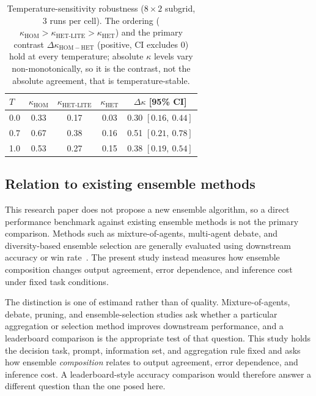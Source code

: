\documentclass{ieeeaccess}
\begin{document}
\begin{table}[!t]
\centering
\caption{Temperature-sensitivity robustness ($8\times 2$ subgrid, 3 runs per
cell). The ordering ($\kappa_{\mathrm{HOM}}>\kappa_{\mathrm{HET\text{-}LITE}}>\kappa_{\mathrm{HET}}$)
and the primary contrast $\Delta\kappa_{\mathrm{HOM-HET}}$ (positive, CI excludes
0) hold at every temperature; absolute $\kappa$ levels vary non-monotonically, so
it is the contrast, not the absolute agreement, that is temperature-stable.}
\label{tab:temp}
\begin{tabular}{lcccc}
\toprule
$T$ & $\kappa_{\mathrm{HOM}}$ & $\kappa_{\mathrm{HET\text{-}LITE}}$ &
$\kappa_{\mathrm{HET}}$ & $\Delta\kappa$ [95\% CI] \\
\midrule
0.0 & 0.33 & 0.17 & 0.03 & 0.30 $[0.16,\ 0.44]$ \\
0.7 & 0.67 & 0.38 & 0.16 & 0.51 $[0.21,\ 0.78]$ \\
1.0 & 0.53 & 0.27 & 0.15 & 0.38 $[0.19,\ 0.54]$ \\
\bottomrule
\end{tabular}
\end{table}

\subsection{Relation to existing ensemble methods}
This research paper does not propose a new ensemble algorithm, so a direct
performance
benchmark against existing ensemble methods is not the primary comparison.
Methods such as mixture-of-agents, multi-agent debate, and diversity-based
ensemble selection are generally evaluated using downstream accuracy or win
rate~\cite{wang2024moa}. The present study instead measures how ensemble
composition changes output agreement, error dependence, and inference cost under
fixed task conditions.

The distinction is one of estimand rather than of quality. Mixture-of-agents,
debate, pruning, and ensemble-selection studies ask whether a particular
aggregation or selection method improves downstream performance, and a
leaderboard comparison is the appropriate test of that question. This study holds
the decision task, prompt, information set, and aggregation rule fixed and asks
how ensemble \emph{composition} relates to output agreement, error dependence,
and inference cost. A leaderboard-style accuracy comparison would therefore
answer a different question than the one posed here.
\end{document}
